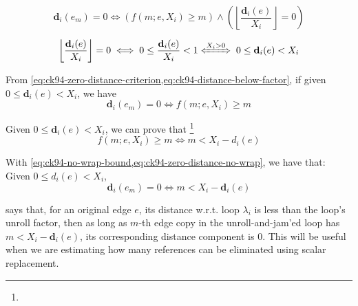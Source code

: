 \begin{equation}
    \mathbf{d}_{i}(e_{m}) = 0
    \iff
    \left(f(m; e, X_{i}) \ge m\right) \land \left(\left\lfloor
    \frac{\mathbf{d}_{i}(e)}{X_{i}} \right\rfloor = 0 \right)
  \label{eq:ck94-zero-distance-criterion}
\end{equation}

\begin{equation}
  \left\lfloor  \frac{\mathbf{d}_{i}(e)}{X_{i}} \right\rfloor = 0
  \iff 0 \le \frac{\mathbf{d}_{i}(e)}{X_{i}} < 1
  \xLeftrightarrow{X_{i} > 0} \;
  0\le \mathbf{d}_{i}(e) < X_{i}
  \label{eq:ck94-distance-below-factor}
\end{equation}

From \cref{eq:ck94-zero-distance-criterion,eq:ck94-distance-below-factor}, if
given $0 \le \mathbf{d}_{i}(e) < X_{i}$, we have
\begin{equation}
  \mathbf{d}_{i}(e_{m}) = 0 \iff f(m; e, X_{i}) \ge m
    \label{eq:ck94-zero-distance-no-wrap}
\end{equation}

Given $0 \le \mathbf{d}_{i}(e) < X_{i}$, we can prove that
\footnote{}
\begin{equation}
  f(m; e, X_{i}) \ge m \iff m < X_{i} - d_{i}(e)
  \label{eq:ck94-no-wrap-bound}
\end{equation}

With \cref{eq:ck94-no-wrap-bound,eq:ck94-zero-distance-no-wrap},
we have that: Given $0 \le d_{i}(e) < X_{i}$,
\begin{equation}
  \mathbf{d}_{i}(e_{m}) = 0 \iff m < X_{i} - \mathbf{d}_{i}(e)
  \label{eq:ck94-zero-distance-copy-bound}
\end{equation}

 says that, for an original edge $e$, its
distance w.r.t. loop $\lambda_{i}$ is less than the loop's unroll factor, then
as long as $m$-th edge copy in the unroll-and-jam'ed loop has $m < X_{i} -
\mathbf{d}_{i}(e)$, its corresponding distance component is 0. This will be
useful when we are estimating how many references can be eliminated using scalar
replacement.


